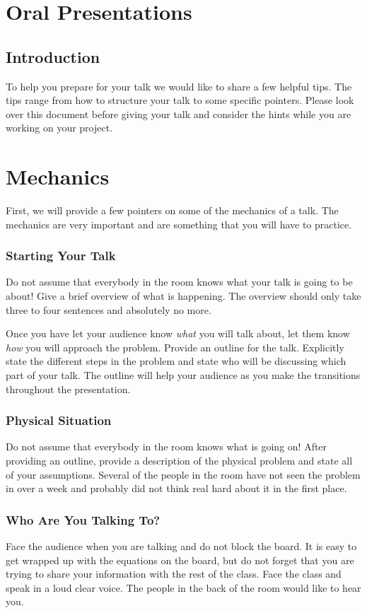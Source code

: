 \section{Oral Presentations}

\subsection{Introduction}
To help you prepare for your talk we would like to share a few helpful
tips.  The tips range from how to structure your
talk to some specific pointers. Please look over this document before
giving your talk and consider the hints while you are working on your
project.

\section{Mechanics}
First, we will provide a few pointers on some of the mechanics of a
talk. The mechanics are very important and are something that you will
have to practice.

\subsubsection{Starting Your Talk} Do not assume that everybody in the
room knows what your talk is going to be about! Give a brief overview
of what is happening. The overview should only take three to four
sentences and absolutely no more. 

Once you have let your audience know \textit{what} you will talk
about, let them know \textit{how} you will approach the problem.
Provide an outline for the talk. Explicitly state the different steps
in the problem and state who will be discussing which part of your
talk. The outline will help your audience as you make the transitions
throughout the presentation.

\subsubsection{Physical Situation}
Do not assume that everybody in the room knows what is going on!
 After providing an outline, provide
a description of the physical problem and state all of your
assumptions. Several of the people in the room have not seen the
problem in over a week and probably did not think real hard about it
in the first place.

\subsubsection{Who Are You Talking To?}  Face the audience when you are
talking and do not block the board. It is easy to get wrapped up with
the equations on the board, but do not forget that you are trying to
share your information with the rest of the class. Face the class and
speak in a loud clear voice. The people in the back of the room would
like to hear you.


